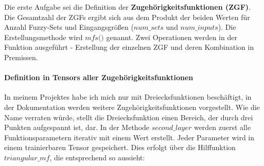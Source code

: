 Die erste Aufgabe sei die Definition der
\textbf{Zugehörigkeitsfunktionen (ZGF)}. Die Gesamtzahl der ZGFs ergibt
sich aus dem Produkt der beiden Werten für Anzahl Fuzzy-Sets und
Eingangsgrößen (\(\textit{num_sets}\) und \(\textit{num_inputs}\)). Die
Erstellungsmethode wird \(\textit{mfs()}\) genannt. Zwei Operationen
werden in der Funktion ausgeführt - Erstellung der einzelnen ZGF und
deren Kombination in Premissen.

\hypertarget{definition-in-tensors-aller-zugehuxf6rigkeitsfunktionen}{%
\paragraph{Definition in Tensors aller
Zugehörigkeitsfunktionen}\label{definition-in-tensors-aller-zugehuxf6rigkeitsfunktionen}}

In meinem Projektes habe ich mich nur mit Dreiecksfunktionen
beschäftigt, in der Dokumentation werden weitere
Zugehörigkeitsfunktionen vorgestellt. Wie die Name verraten würde,
stellt die Dreiecksfunktion einen Bereich, der durch drei Punkten
aufgespannt ist, dar. In der Methode \(\textit{second_layer}\) werden
zuerst alle Funktionsparametern iterativ mit einem Wert erstellt. Jeder
Parameter wird in einem trainierbaren Tensor gespeichert. Dies erfolgt
über die Hilffunktion \(\textit{triangular_mf}\), die entsprechend so
aussieht:


